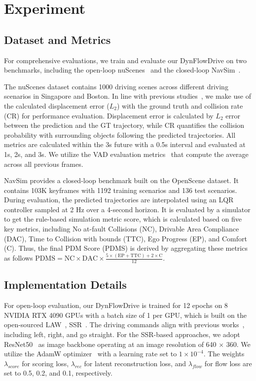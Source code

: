 \section{Experiment}

\subsection{Dataset and Metrics}
For comprehensive evaluations, we train and evaluate our DynFlowDrive on two benchmarks, including the open-loop nuScenes~\cite{caesar2020nuscenes} and the closed-loop NavSim~\cite{dauner2024navsim}.

 The nuScenes dataset contains 1000 driving scenes across different driving scenarios in Singapore and Boston. In line with previous studies~\cite{li2024law, li2024ssr, li2024ego}, we make use of the calculated displacement error ($L_2$) with the ground truth and collision rate (CR) for performance evaluation. Displacement error is calculated by $L_2$ error between the prediction and the GT trajectory, while CR quantifies the collision probability with surrounding objects following the predicted trajectories. All metrics are calculated within the 3s future with a 0.5s interval and evaluated at 1s, 2s, and 3s. We utilize the VAD evaluation metrics~\cite{jiang2023vad} that compute the average across all previous frames.

 NavSim provides a closed-loop benchmark built on the OpenScene dataset. It contains 103K keyframes with 1192 training scenarios and 136 test scenarios. During evaluation, the predicted trajectories are interpolated using an LQR controller sampled at 2 Hz over a 4-second horizon. It is evaluated by a simulator to get the rule-based simulation metric score, which is calculated based on five key metrics, including No at-fault Collisions (NC),
Drivable Area Compliance (DAC), Time to Collision with
bounds (TTC), Ego Progress (EP), and Comfort (C). Thus, the final
PDM Score (PDMS) is derived by aggregating these metrics as follows
$
    \text{PDMS} = \text{NC} \times \text{DAC} \times \frac{5 \times (\text{EP} + \text{TTC}) + 2 \times \text{C}}{12}
$.
\subsection{Implementation Details}

 For open-loop evaluation, our DynFlowDrive is trained for 12 epochs on 8 NVIDIA RTX 4090 GPUs with a batch size of 1 per GPU, which is built on the open-sourced LAW~\cite{li2024law}, SSR~\cite{li2024ssr}. The driving commands align with previous works~\cite{hu2023planning}, including left, right, and go straight. For the SSR-based approaches, we adopt
ResNet50~\cite{he2016deep} as image backbone operating at an image resolution of 640 × 360. We utilize the AdamW optimizer~\cite{loshchilov2017decoupled} with a learning rate set to $1 \times 10^{-4}$. The weights $\lambda_{score}$ for scoring loss, $\lambda_{rec}$ for latent reconstruction loss, and $\lambda_{flow}$ for flow loss are set to 0.5, 0.2, and 0.1, respectively.  

